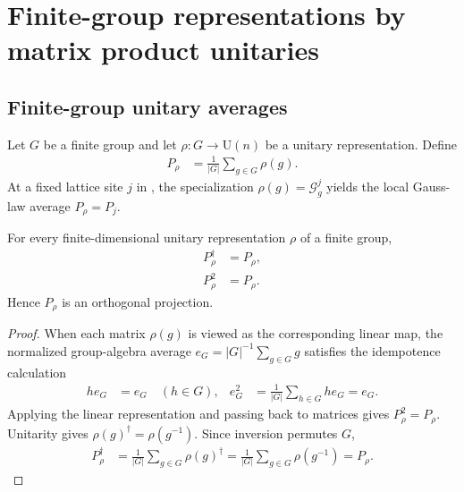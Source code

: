 \chapter{Finite-group representations by matrix product unitaries}%
\label{ch:mpu_gauging}

\section{Finite-group unitary averages}

\begin{definition}
    \label{def:mpug_finite_group_unitary_average}
    \mathlibok %
    Let $G$ be a finite group and let $\rho\colon G\to\mathrm U(n)$ be a
    unitary representation. Define
    \begin{align}
        P_\rho & = \frac{1}{|G|}\sum_{g\in G}\rho(g).
    \end{align}
    At a fixed lattice site $j$ in
    \cite[lines~459--461]{FrancoRubio2025MPUGauging}, the specialization
    $\rho(g)=\mathcal G_g^j$ yields the local Gauss-law average $P_\rho=P_j$.
\end{definition}

\begin{lemma}
    \label{thm:mpug_finite_group_unitary_average_projection}
    \leanok
    For every finite-dimensional unitary representation $\rho$ of a finite
    group,
    \begin{align}
        P_\rho^\dagger & =P_\rho, \\
        P_\rho^2       & =P_\rho.
    \end{align}
    Hence $P_\rho$ is an orthogonal projection.
\end{lemma}

\begin{proof}\leanok
    When each matrix $\rho(g)$ is viewed as the corresponding linear map, the
    normalized group-algebra average $e_G=|G|^{-1}\sum_{g\in G}g$ satisfies the
    idempotence calculation
    \begin{align}
        h e_G & =e_G \quad (h\in G),                  &
        e_G^2 & =\frac{1}{|G|}\sum_{h\in G}h e_G=e_G.
    \end{align}
    Applying the linear representation and passing back to matrices gives
    $P_\rho^2=P_\rho$.
    Unitarity gives $\rho(g)^\dagger=\rho(g^{-1})$. Since inversion permutes
    $G$,
    \begin{align}
        P_\rho^\dagger
         & = \frac{1}{|G|}\sum_{g\in G}\rho(g)^\dagger
        = \frac{1}{|G|}\sum_{g\in G}\rho(g^{-1})
        = P_\rho.
    \end{align}
\end{proof}

